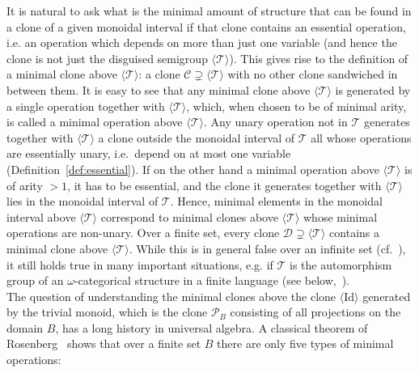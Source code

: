 \documentclass{article}
\theoremstyle{remark}
\theoremstyle{definition}
\begin{document}
It is natural to ask what is the minimal amount of structure that can be found in a clone of a given monoidal interval if that clone contains an essential operation, i.e. an  operation which depends on more than just one variable (and hence the clone is not just the disguised semigroup $\langle \mathcal{T}\rangle$). This gives rise to the definition of a minimal clone above $\langle \mathcal{T}\rangle$: a clone $\mathcal{C}\supsetneq\langle\mathcal{T}\rangle$ with no other clone sandwiched in between them. It is easy to see that any minimal clone above $\langle \mathcal{T}\rangle$ is generated by a single operation together with $\langle \mathcal{T}\rangle$, which, when chosen to be of minimal arity, is called a minimal operation above $\langle \mathcal{T}\rangle$. Any unary operation not in $\mathcal{T}$ generates together with $\langle\mathcal{T}\rangle$ a clone outside the monoidal interval of $\mathcal{T}$ all whose operations are essentially unary, i.e.\ depend on at most one variable  (Definition~\ref{def:essential}). If on the other hand a minimal operation above $\langle\mathcal{T}\rangle$ is of arity $>1$, it has to be essential,  and the clone it generates together with $\langle\mathcal{T}\rangle$ lies in the monoidal interval of $\mathcal{T}$. Hence, minimal elements in the monoidal interval above $\langle \mathcal{T}\rangle$ correspond to minimal clones above $\langle \mathcal{T}\rangle$ whose minimal operations are non-unary.  Over a finite set, every clone $\mathcal{D}\supsetneq{\langle\mathcal{T}\rangle}$ contains a minimal clone above ${\langle\mathcal{T}\rangle}$. While this is in general  false over an infinite set (cf.~\cite{csakany2005minimal}), it still holds true in many important situations, e.g. if $\mathcal{T}$ is the automorphism group of an $\omega$-categorical structure in a finite language (see below,~\cite{BodChen}). \\ 

















The question of understanding the minimal clones above the clone $\langle \mathrm{Id} \rangle$  generated by the trivial monoid, which is the clone $\mathcal{P}_B$ consisting of all  projections on the domain $B$, has a long history in universal algebra. A classical theorem of Rosenberg~\cite{fivetypes} shows that over a finite set $B$  there are only five types of minimal operations:
\end{document}
